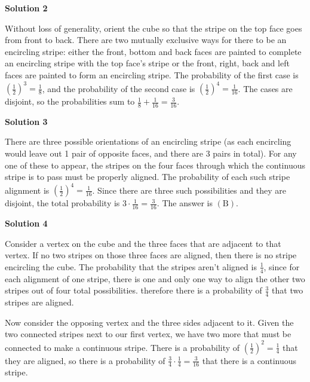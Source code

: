 \begin{enumerate}
 



\textbf{Solution 2}

Without loss of generality, orient the cube so that the stripe on the top face goes from front to back.  There are two mutually exclusive ways for there to be an encircling stripe: either the front, bottom and back faces are painted to complete an encircling stripe with the top face's stripe or the front, right, back and left faces are painted to form an encircling stripe.  The probability of the first case is $\left(\frac 12\right)^3 = \frac 18$, and the probability of the second case is $\left(\frac 12\right)^4 = \frac {1}{16}$.  The cases are disjoint, so the probabilities sum to $\frac 18 + \frac {1}{16} = \boxed {\frac {3}{16}}$.

 



\textbf{Solution 3}

There are three possible orientations of an encircling stripe (as each encircling would leave out 1 pair of opposite faces, and there are 3 pairs in total).  For any one of these to appear, the stripes on the four faces through which the continuous stripe is to pass must be properly aligned.  The probability of each such stripe alignment is $\left(\frac 12\right)^4 = \frac {1}{16}$.  Since there are three such possibilities and they are disjoint, the total probability is $3 \cdot \frac {1}{16} = \boxed{\frac {3}{16}}$.  The answer is $\mathrm{(B)}$.

 



\textbf{Solution 4}

Consider a vertex on the cube and the three faces that are adjacent to that vertex. If no two stripes on those three faces are aligned, then there is no stripe encircling the cube. The probability that the stripes aren't aligned is $\frac{1}{4}$, since for each alignment of one stripe, there is one and only one way to align the other two stripes out of four total possibilities. therefore there is a probability of $\frac{3}{4}$ that two stripes are aligned.

 Now consider the opposing vertex and the three sides adjacent to it. Given the two connected stripes next to our first vertex, we have two more that must be connected to make a continuous stripe. There is a probability of $\left(\frac{1}{2}\right)^2=\frac{1}{4}$ that they are aligned, so there is a probability of $\frac{3}{4}\cdot \frac{1}{4}=\boxed{\frac {3}{16}}$ that there is a continuous stripe.


\end{enumerate}
